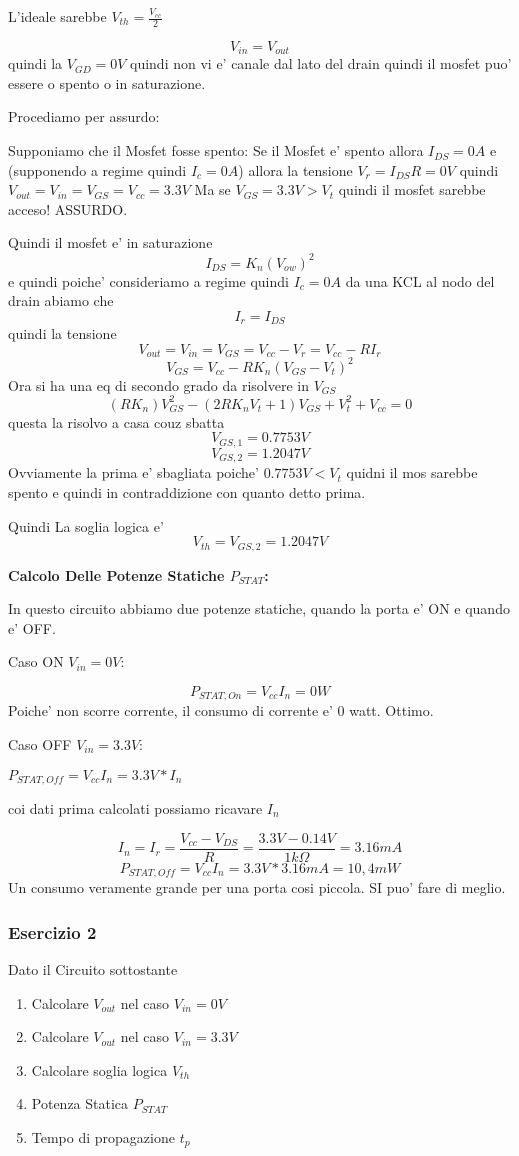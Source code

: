 \documentclass[\main/main.tex]{subfiles}
\begin{document}
L'ideale sarebbe $V_{th} = \frac{V_{cc}}{2}$

\[V_{in} = V_{out}\]
quindi la $V_{GD} = 0V$ quindi non vi e' canale dal lato del drain quindi il mosfet puo' essere o spento o in saturazione.

Procediamo per assurdo:

Supponiamo che il Mosfet fosse spento:
Se il Mosfet e' spento allora $I_{DS} = 0A$ e (supponendo a regime quindi $I_c = 0A$) allora la tensione $V_r = I_{DS} R = 0V$ quindi $V_{out} = V_{in} = V_{GS} = V_{cc} = 3.3V$
Ma se $V_{GS} = 3.3V > V_t$ quindi il mosfet sarebbe acceso!
ASSURDO.

Quindi il mosfet e' in saturazione
\[I_{DS} = K_n \left(V_{ow}\right)^2 \]
e quindi poiche' consideriamo a regime quindi $I_c = 0A$
da una KCL al nodo del drain abiamo che
\[I_r = I_{DS} \]
quindi la tensione
\[V_{out} = V_{in} = V_{GS} = V_{cc} - V_r = V_{cc} - R I_r\]
\[V_{GS} = V_{cc} - R K_n \left(V_{GS} - V_t \right)^2\]
Ora si ha una eq di secondo grado da risolvere in $V_{GS}$
\[(R K_n)V_{GS}^2 - (2 R K_n V_t + 1)V_{GS} + V_t^2 + V_{cc} = 0\]
questa la risolvo a casa couz sbatta
\[V_{GS,1} = 0.7753V\]
\[V_{GS,2} = 1.2047V\]
Ovviamente la prima e' sbagliata poiche' $0.7753V < V_t$ quidni il mos sarebbe spento e quindi in contraddizione con quanto detto prima.

Quindi La soglia logica e' \[V_{th} = V_{GS,2} = 1.2047V\]

\textbf{Calcolo Delle Potenze Statiche $P_{STAT}$:}

In questo circuito abbiamo due potenze statiche, quando la porta e' ON e quando e' OFF.

Caso ON $V_{in} = 0V$:

\[P_{STAT,On} = V_{cc} I_{n} = 0W\]
Poiche' non scorre corrente, il consumo di corrente e' 0 watt. Ottimo.


Caso OFF $V_{in} = 3.3V$:

$P_{STAT,Off} = V_{cc} I_{n} = 3.3V * I_{n}$

coi dati prima calcolati possiamo ricavare $I_{n}$

\[I_{n} = I_{r} = \frac{V_{cc} - V_{DS}}{R} = \frac{3.3V - 0.14V}{1k\Omega} = 3.16mA\]
\[P_{STAT,Off} = V_{cc} I_{n} = 3.3V * 3.16mA = 10,4mW\]
Un consumo veramente grande per una porta cosi piccola. SI puo' fare di meglio.

\clearpage
\subsubsection{Esercizio 2}
Dato il Circuito sottostante
\begin{enumerate}
\item  Calcolare $V_{out}$ nel caso $V_{in} = 0V$
\item  Calcolare $V_{out}$ nel caso $V_{in} = 3.3V$
\item  Calcolare soglia logica $V_{th}$
\item  Potenza Statica $P_{STAT}$
\item  Tempo di propagazione $t_p$
\end{enumerate}
\end{document}
